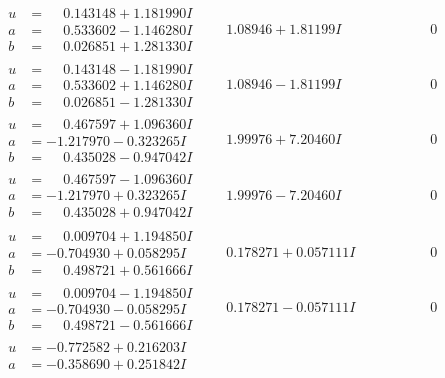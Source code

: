 \documentclass[1p]{elsarticle_modified}
\theoremstyle{definition}
\begin{document}
$$\begin{array}{c|c|c}
\begin{aligned}
u &= \phantom{-}0.143148 + 1.181990 I \\
a &= \phantom{-}0.533602 - 1.146280 I \\
b &= \phantom{-}0.026851 + 1.281330 I\end{aligned}
 & \phantom{-}1.08946 + 1.81199 I & \phantom{-0.000000 } 0 \\ \hline\begin{aligned}
u &= \phantom{-}0.143148 - 1.181990 I \\
a &= \phantom{-}0.533602 + 1.146280 I \\
b &= \phantom{-}0.026851 - 1.281330 I\end{aligned}
 & \phantom{-}1.08946 - 1.81199 I & \phantom{-0.000000 } 0 \\ \hline\begin{aligned}
u &= \phantom{-}0.467597 + 1.096360 I \\
a &= -1.217970 - 0.323265 I \\
b &= \phantom{-}0.435028 - 0.947042 I\end{aligned}
 & \phantom{-}1.99976 + 7.20460 I & \phantom{-0.000000 } 0 \\ \hline\begin{aligned}
u &= \phantom{-}0.467597 - 1.096360 I \\
a &= -1.217970 + 0.323265 I \\
b &= \phantom{-}0.435028 + 0.947042 I\end{aligned}
 & \phantom{-}1.99976 - 7.20460 I & \phantom{-0.000000 } 0 \\ \hline\begin{aligned}
u &= \phantom{-}0.009704 + 1.194850 I \\
a &= -0.704930 + 0.058295 I \\
b &= \phantom{-}0.498721 + 0.561666 I\end{aligned}
 & \phantom{-}0.178271 + 0.057111 I & \phantom{-0.000000 } 0 \\ \hline\begin{aligned}
u &= \phantom{-}0.009704 - 1.194850 I \\
a &= -0.704930 - 0.058295 I \\
b &= \phantom{-}0.498721 - 0.561666 I\end{aligned}
 & \phantom{-}0.178271 - 0.057111 I & \phantom{-0.000000 } 0 \\ \hline\begin{aligned}
u &= -0.772582 + 0.216203 I \\
a &= -0.358690 + 0.251842 I \\

\end{aligned}
\end{array}$$
\end{document}
